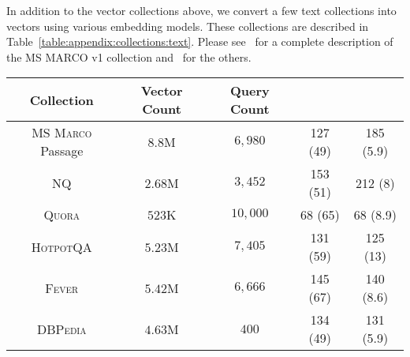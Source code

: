 In addition to the vector collections above, we convert a few text collections
into vectors using various embedding models. These collections are described in
Table~\ref{table:appendix:collections:text}. Please see~\citep{nguyen2016msmarco} for
a complete description of the MS MARCO v1 collection and~\citep{thakur2021beir} for the others.

\begin{table*}[ht]
\caption{Text collections along with key statistics.
The rightmost two columns report the average number of non-zero
entries in data points and, in parentheses, queries for sparse vector
representations of the collections.}
\scriptsize
\label{table:appendix:collections:text}
\begin{center}
\begin{sc}
\begin{tabular}{c|cc|cc}
\toprule
Collection & Vector Count & Query Count & \splade{} & \esplade{}\\
\midrule
\textsc{MS Marco} Passage& $8.8$M & $6{,}980$ & 127 (49) & 185 (5.9) \\
NQ & $2.68$M & $3{,}452$ & 153 (51) & 212 (8) \\
\textsc{Quora} & $523$K & $10{,}000$ & 68 (65) & 68 (8.9) \\
\textsc{HotpotQA} & $5.23$M & $7{,}405$ & 131 (59) & 125 (13) \\
\textsc{Fever} & $5.42$M & $6{,}666$ & 145 (67) & 140 (8.6) \\
\textsc{DBPedia} & $4.63$M & $400$ & 134 (49) & 131 (5.9) \\
\bottomrule
\end{tabular}
\end{sc}
\end{center}
\end{table*}

